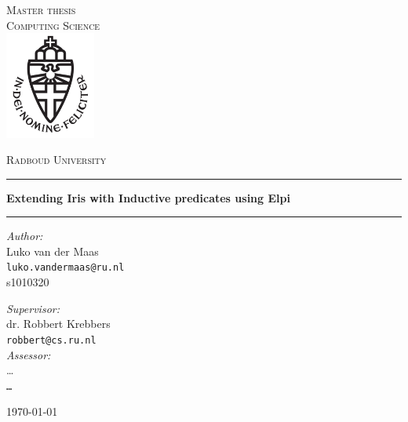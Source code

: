 \documentclass[11pt,a4paper]{report}
\begin{document}
\renewcommand{\sectionautorefname}{Section}
\renewcommand{\subsectionautorefname}{Section}
\renewcommand{\chapterautorefname}{Chapter}

\begin{titlepage}
  \begin{center}
    \textsc{\LARGE Master thesis\\Computing Science}\\[1.5cm]
    \includegraphics[height=100pt]{logo}

    \vspace{0.4cm}
    \textsc{\Large Radboud University}\\[1cm]
    \hrule
    \vspace{0.4cm}
    \textbf{\huge Extending Iris with Inductive predicates using Elpi}\\[0.4cm]
    \hrule
    \vspace{2cm}
    \begin{minipage}[t]{0.45\textwidth}
      \begin{flushleft} \large
        \textit{Author:}\\
        Luko van der Maas\\
        \texttt{luko.vandermaas@ru.nl}\\
        s1010320
      \end{flushleft}
    \end{minipage}
    \begin{minipage}[t]{0.45\textwidth}
      \begin{flushright} \large
        \textit{Supervisor:}\\
        dr. Robbert Krebbers\\
        \texttt{robbert@cs.ru.nl}\\[1.3cm]
        \textit{Assessor:}\\
        \dots\\
        \texttt{\dots}
      \end{flushright}
    \end{minipage}
    \vfill
    {\large \today}
  \end{center}
\end{titlepage}
\end{document}
